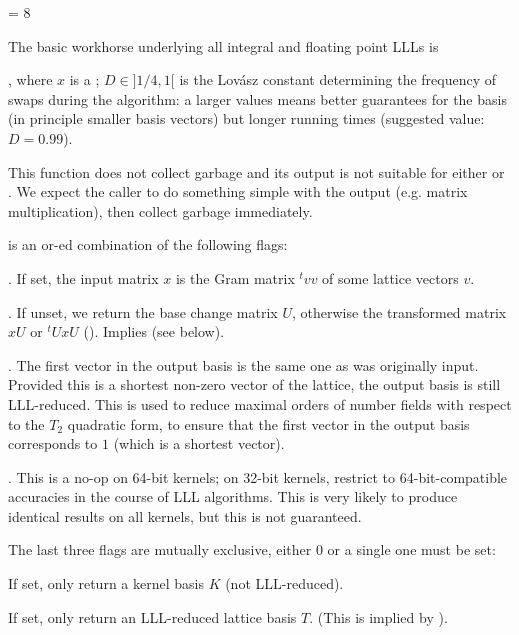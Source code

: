  \fl = 8

\smallskip

The basic workhorse underlying all integral and floating point LLLs is

, where $x$ is a ;
$D \in ]1/4,1[$ is the Lov\'{a}sz constant determining the frequency of
swaps during the algorithm: a larger values means better guarantees for
the basis (in principle smaller basis vectors) but longer running times
(suggested value: $D = 0.99$).

 This function does not collect garbage and its output
is not suitable for either  or . We expect
the caller to do something simple with the output (e.g. matrix
multiplication), then collect garbage immediately.

\noindent{} is an or-ed combination of the following flags:

\item  {}. If set, the input matrix $x$ is the Gram matrix ${}^t
v v$ of some lattice vectors $v$.

\item  {}. If unset, we return the base change matrix $U$,
otherwise the transformed matrix $x U$ or ${}^t U x U$ ().
Implies  (see below).

\item  {}. The first vector in the output basis is the same
one as was originally input. Provided this is a shortest non-zero vector of
the lattice, the output basis is still LLL-reduced. This is used to reduce
maximal orders of number fields with respect to the $T_2$ quadratic form, to
ensure that the first vector in the output basis corresponds to $1$ (which is
a shortest vector).

\item  {}. This is a no-op on 64-bit kernels; on 32-bit
kernels, restrict to 64-bit-compatible accuracies in the course of LLL
algorithms. This is very likely to produce identical results on all
kernels, but this is not guaranteed.

The last three flags are mutually exclusive, either 0 or a single one must be
set:

\item  {} If set, only return a kernel basis $K$ (not LLL-reduced).

\item  {} If set, only return an LLL-reduced lattice basis $T$.
(This is implied by ).

